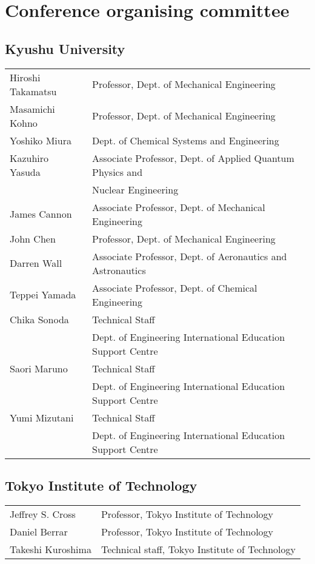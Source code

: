 \section{Conference organising committee}

\subsection*{Kyushu University}
\begin{tabular}{ll}
    Hiroshi Takamatsu & Professor, Dept. of Mechanical Engineering \\
    Masamichi Kohno & Professor, Dept. of Mechanical Engineering \\
    Yoshiko Miura   & Dept. of Chemical Systems and Engineering \\
    Kazuhiro Yasuda & Associate Professor, Dept. of Applied Quantum Physics and\\
                    & Nuclear Engineering \\
    James Cannon    & Associate Professor, Dept. of Mechanical Engineering \\
    John Chen       & Professor, Dept. of Mechanical Engineering \\
    Darren Wall     & Associate Professor,  Dept. of Aeronautics and Astronautics \\
    Teppei Yamada   & Associate Professor, Dept. of Chemical Engineering \\
    Chika Sonoda    & Technical Staff \\ 
                    & Dept. of Engineering International Education Support Centre \\
    Saori Maruno    & Technical Staff\\
                    & Dept. of Engineering International Education Support Centre \\
    Yumi Mizutani   & Technical Staff\\
                    & Dept. of Engineering International Education Support Centre \\
\end{tabular}

\subsection*{Tokyo Institute of Technology}

\begin{tabular}{ll}
    Jeffrey S. Cross & Professor, Tokyo Institute of Technology \\
    Daniel Berrar & Professor, Tokyo Institute of Technology \\
    Takeshi Kuroshima & Technical staff, Tokyo Institute of Technology \\
\end{tabular}
